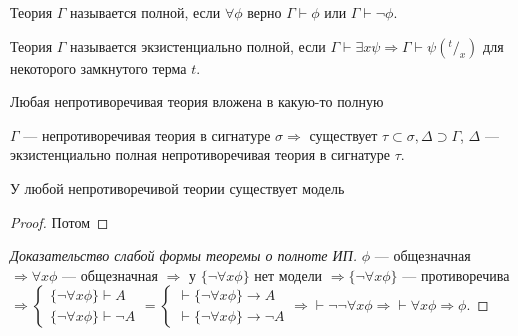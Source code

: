 \begin{definition}
    Теория $\Gamma$ называется полной, если $\forall \phi$ верно $\Gamma \vdash \phi$ или $\Gamma \vdash \neg\phi$.
\end{definition}

\begin{definition}
    Теория $\Gamma$ называется экзистенциально полной, если $\Gamma \vdash \exists x \psi \Rightarrow \Gamma \vdash \psi(^t/_x)$ для некоторого замкнутого терма $t$.
\end{definition}

\begin{lemma}
    Любая непротиворечивая теория вложена в какую-то полную
\end{lemma}

\begin{lemma}
    $\Gamma$ --- непротиворечивая теория в сигнатуре $\sigma \Rightarrow$ существует $\tau \subset \sigma, \Delta \supset \Gamma$, $\Delta$ --- экзистенциально полная непротиворечивая теория в сигнатуре $\tau$.
\end{lemma}

\begin{theorem}
    У любой непротиворечивой теории существует модель
\end{theorem}
\begin{proof}
    Потом
\end{proof}


\begin{proof}[Доказательство слабой формы теоремы о полноте ИП]
    $\phi$ --- общезначная $\Rightarrow \forall x \phi$ --- общезначная $\Rightarrow$ у $\{\neg \forall x \phi\}$ нет модели $\Rightarrow \{\neg \forall x \phi\}$ --- противоречива $\Rightarrow \left\{\begin{array}{l}
        \{\neg \forall x \phi\} \vdash A  \\
        \{\neg \forall x \phi\} \vdash \neg A 
    \end{array}\right. = \left\{\begin{array}{l}
        \vdash \{\neg \forall x \phi\} \rightarrow A  \\
        \vdash \{\neg \forall x \phi\} \rightarrow \neg A 
    \end{array}\right. \Rightarrow \vdash \neg\neg \forall x \phi \Rightarrow \vdash \forall x \phi \Rightarrow \phi$. 
\end{proof}